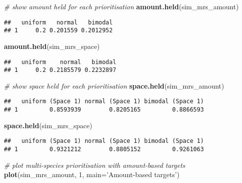 \documentclass[11pt,]{article}
\newenvironment{Shaded}{\begin{snugshade}}{\end{snugshade}}
\newcommand{\KeywordTok}[1]{\textcolor[rgb]{0.13,0.29,0.53}{\textbf{{#1}}}}
\newcommand{\DataTypeTok}[1]{\textcolor[rgb]{0.13,0.29,0.53}{{#1}}}
\newcommand{\DecValTok}[1]{\textcolor[rgb]{0.00,0.00,0.81}{{#1}}}
\newcommand{\StringTok}[1]{\textcolor[rgb]{0.31,0.60,0.02}{{#1}}}
\newcommand{\CommentTok}[1]{\textcolor[rgb]{0.56,0.35,0.01}{\textit{{#1}}}}
\newcommand{\NormalTok}[1]{{#1}}
\begin{document}
\begin{Shaded}
\begin{Highlighting}[]
\CommentTok{# show amount held for each prioritisation}
\KeywordTok{amount.held}\NormalTok{(sim_mrs_amount)}
\end{Highlighting}
\end{Shaded}

\begin{verbatim}
##   uniform   normal   bimodal
## 1     0.2 0.201559 0.2012952
\end{verbatim}

\begin{Shaded}
\begin{Highlighting}[]
\KeywordTok{amount.held}\NormalTok{(sim_mrs_space)}
\end{Highlighting}
\end{Shaded}

\begin{verbatim}
##   uniform    normal   bimodal
## 1     0.2 0.2185579 0.2232897
\end{verbatim}

\begin{Shaded}
\begin{Highlighting}[]
\CommentTok{# show space held for each prioritisation}
\KeywordTok{space.held}\NormalTok{(sim_mrs_amount)}
\end{Highlighting}
\end{Shaded}

\begin{verbatim}
##   uniform (Space 1) normal (Space 1) bimodal (Space 1)
## 1         0.8593939        0.8205165         0.8866593
\end{verbatim}

\begin{Shaded}
\begin{Highlighting}[]
\KeywordTok{space.held}\NormalTok{(sim_mrs_space)}
\end{Highlighting}
\end{Shaded}

\begin{verbatim}
##   uniform (Space 1) normal (Space 1) bimodal (Space 1)
## 1         0.9321212        0.8805152         0.9261063
\end{verbatim}

\begin{Shaded}
\begin{Highlighting}[]
\CommentTok{# plot multi-species prioritisation with amount-based targets}
\KeywordTok{plot}\NormalTok{(sim_mrs_amount, }\DecValTok{1}\NormalTok{, }\DataTypeTok{main=}\StringTok{'Amount-based targets'}\NormalTok{)}
\end{Highlighting}
\end{Shaded}
\end{document}
